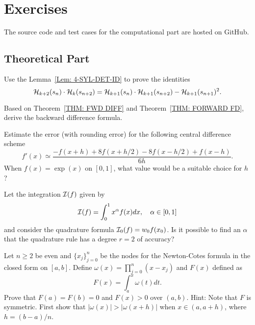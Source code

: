 \begin{example}
    
\end{example}

\section{Exercises}
The source code and test cases for the computational part are hosted on GitHub.

\subsection{Theoretical Part}
\begin{problem}
    Use the Lemma~\ref{Lem: 4-SYL-DET-ID} to prove the identities
    \begin{equation}
    \mathcal H_{k+2}(s_n) \cdot \mathcal H_{k}(s_{n+2}) = \mathcal H_{k+1}(s_n) \cdot \mathcal H_{k+1}(s_{n+2}) - \mathcal H_{k+1}(s_{n+1}) ^2 .
    \end{equation}
\end{problem}
\begin{problem}
\label{Prb: 3-Bac-Dif}
    Based on Theorem~\ref{THM: FWD DIFF} and Theorem~\ref{THM: FORWARD FD}, derive the backward difference formula.
\end{problem}
\begin{problem}
    Estimate the error (with rounding error) for the following central difference scheme
    $$f'(x)\simeq \frac{-f(x + h) + 8f(x + h/2) - 8 f(x - h/2) + f(x - h)}{6h}.$$
    When $f(x)=\exp(x)$ on $[0, 1]$, what value would be a suitable choice for $h$?
\end{problem}
\begin{problem}
    Let the integration $\mathcal I(f)$ given by
    $$\mathcal I(f) = \int_0^1 x^{\alpha} f(x) dx,\quad \alpha\in [0, 1]$$
    and consider the quadrature formula $\mathcal I_0(f) = w_0 f(x_0)$. Is it possible to find an $\alpha$ that the quadrature rule has a degree $r= 2$ of accuracy?
\end{problem}
\begin{problem}
\label{Prb: 3-Exe-4}
    Let $n\ge 2$ be even and $\{ x_j\}_{j=0}^n$ be the nodes for the Newton-Cotes formula in the closed form on $[a, b]$. Define $\omega(x)=\prod_{j=0}^n (x - x_j)$ and $F(x)$ defined as 
    $$F(x) = \int_a^x \omega(t)dt.$$
    Prove that $F(a) = F(b) = 0$ and $F(x) > 0$ over $(a ,b)$. 
    Hint: Note that $F$ is symmetric. First show that $|\omega(x)| > |\omega(x + h)|$ when $x\in (a, a + h)$, where $h = (b-a)/n$.
\end{problem}
